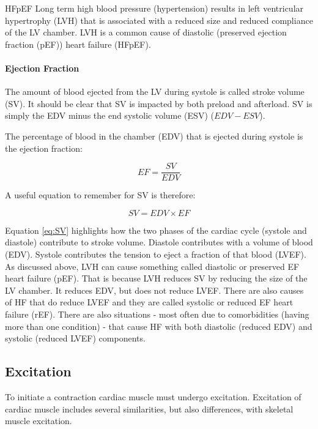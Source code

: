 \begin{warning}{HFpEF}
   Long term high blood pressure (hypertension) results in left ventricular hypertrophy (LVH) that is associated with a reduced size and reduced compliance of the LV chamber. LVH is a common cause of diastolic (preserved ejection fraction (pEF)) heart failure (HFpEF).
\end{warning}

\paragraph{Ejection Fraction}

The amount of blood ejected from the LV during systole is called stroke volume (SV). It should be clear that SV is impacted by both preload and afterload. SV is simply the EDV minus the end systolic volume (ESV) ($EDV-ESV$). 

The percentage of blood in the chamber (EDV) that is ejected during systole is the ejection fraction: 

\begin{equation}
    EF = \frac{SV}{EDV}
    \label{eq:LVEF}
\end{equation}

A useful equation to remember for SV is therefore:

\begin{equation}
    SV = EDV \times EF
    \label{eq:SV}
\end{equation}

Equation \ref{eq:SV} highlights how the two phases of the cardiac cycle (systole and diastole) contribute to stroke volume. Diastole contributes with a volume of blood (EDV). Systole contributes the tension to eject a fraction of that blood (LVEF). As discussed above, LVH can cause something called diastolic or preserved EF heart failure (pEF). That is because LVH reduces SV by reducing the size of the LV chamber. It reduces EDV, but does not reduce LVEF. There are also causes of HF that do reduce LVEF and they are called systolic or reduced EF heart failure (rEF). There are also situations - most often due to comorbidities (having more than one condition) - that cause HF with both diastolic (reduced EDV) and systolic (reduced LVEF) components. 

\subsection{Excitation}

To initiate a contraction cardiac muscle must undergo excitation. Excitation of cardiac muscle includes several similarities, but also differences, with skeletal muscle excitation. 

